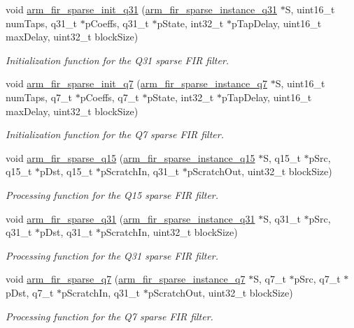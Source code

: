 \begin{DoxyCompactItemize}
void \hyperlink{group___f_i_r___sparse_ga9a0bb2134bc85d3e55c6be6d946ee634}{arm\-\_\-fir\-\_\-sparse\-\_\-init\-\_\-q31} (\hyperlink{structarm__fir__sparse__instance__q31}{arm\-\_\-fir\-\_\-sparse\-\_\-instance\-\_\-q31} $\ast$S, uint16\-\_\-t num\-Taps, q31\-\_\-t $\ast$p\-Coeffs, q31\-\_\-t $\ast$p\-State, int32\-\_\-t $\ast$p\-Tap\-Delay, uint16\-\_\-t max\-Delay, uint32\-\_\-t block\-Size)
\begin{DoxyCompactList}\small\item\em Initialization function for the Q31 sparse F\-I\-R filter. \end{DoxyCompactList}\item 
void \hyperlink{group___f_i_r___sparse_ga98f5c1a097d4572ce4ff3b0c58ebcdbd}{arm\-\_\-fir\-\_\-sparse\-\_\-init\-\_\-q7} (\hyperlink{structarm__fir__sparse__instance__q7}{arm\-\_\-fir\-\_\-sparse\-\_\-instance\-\_\-q7} $\ast$S, uint16\-\_\-t num\-Taps, q7\-\_\-t $\ast$p\-Coeffs, q7\-\_\-t $\ast$p\-State, int32\-\_\-t $\ast$p\-Tap\-Delay, uint16\-\_\-t max\-Delay, uint32\-\_\-t block\-Size)
\begin{DoxyCompactList}\small\item\em Initialization function for the Q7 sparse F\-I\-R filter. \end{DoxyCompactList}\item 
void \hyperlink{group___f_i_r___sparse_ga2bffda2e156e72427e19276cd9c3d3cc}{arm\-\_\-fir\-\_\-sparse\-\_\-q15} (\hyperlink{structarm__fir__sparse__instance__q15}{arm\-\_\-fir\-\_\-sparse\-\_\-instance\-\_\-q15} $\ast$S, q15\-\_\-t $\ast$p\-Src, q15\-\_\-t $\ast$p\-Dst, q15\-\_\-t $\ast$p\-Scratch\-In, q31\-\_\-t $\ast$p\-Scratch\-Out, uint32\-\_\-t block\-Size)
\begin{DoxyCompactList}\small\item\em Processing function for the Q15 sparse F\-I\-R filter. \end{DoxyCompactList}\item 
void \hyperlink{group___f_i_r___sparse_ga03e9c2f0f35ad67d20bac66be9f920ec}{arm\-\_\-fir\-\_\-sparse\-\_\-q31} (\hyperlink{structarm__fir__sparse__instance__q31}{arm\-\_\-fir\-\_\-sparse\-\_\-instance\-\_\-q31} $\ast$S, q31\-\_\-t $\ast$p\-Src, q31\-\_\-t $\ast$p\-Dst, q31\-\_\-t $\ast$p\-Scratch\-In, uint32\-\_\-t block\-Size)
\begin{DoxyCompactList}\small\item\em Processing function for the Q31 sparse F\-I\-R filter. \end{DoxyCompactList}\item 
void \hyperlink{group___f_i_r___sparse_gae86c145efc2d9ec32dc6d8c1ad2ccb3c}{arm\-\_\-fir\-\_\-sparse\-\_\-q7} (\hyperlink{structarm__fir__sparse__instance__q7}{arm\-\_\-fir\-\_\-sparse\-\_\-instance\-\_\-q7} $\ast$S, q7\-\_\-t $\ast$p\-Src, q7\-\_\-t $\ast$p\-Dst, q7\-\_\-t $\ast$p\-Scratch\-In, q31\-\_\-t $\ast$p\-Scratch\-Out, uint32\-\_\-t block\-Size)
\begin{DoxyCompactList}\small\item\em Processing function for the Q7 sparse F\-I\-R filter. \end{DoxyCompactList}\end{DoxyCompactItemize}


